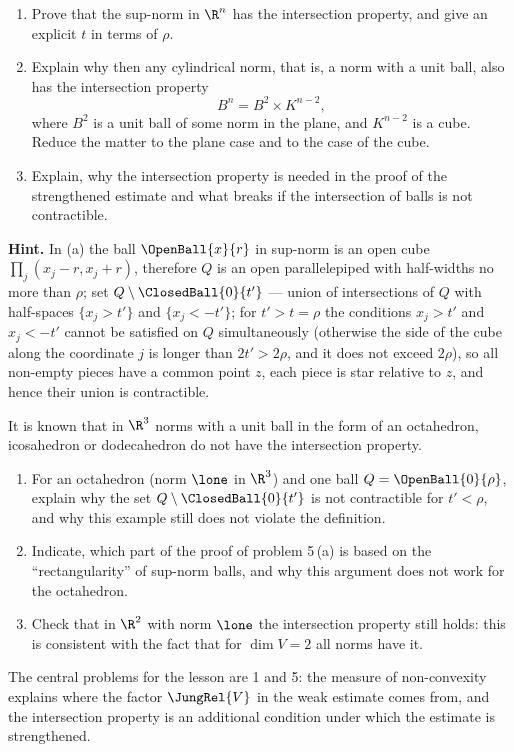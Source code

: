 \documentclass[a4paper,12pt]{report}
\begin{document}
\begin{task}
\begin{enumerate}[label=\textup{(\alph*)}]
\item Prove that the sup-norm in $\R^n$ has the intersection property, and give an explicit $t$ in terms of $\rho$.
\item Explain why then any cylindrical norm, that is, a norm with a unit ball, also has the intersection property
\[
B^n = B^2 \times K^{n-2},
\]
where $B^2$ is a unit ball of some norm in the plane, and $K^{n-2}$ is a cube. Reduce the matter to the plane case and to the case of the cube.
\item Explain\textup{,} why the intersection property is needed in the proof of the strengthened estimate and what breaks if the intersection of balls is not contractible.
\end{enumerate}

\textbf{Hint.} In \textup{(a)} the ball $\OpenBall{x}{r}$ in sup-norm is an open cube $\prod_j (x_j - r, x_j + r)$, therefore $Q$ is an open parallelepiped with half-widths no more than $\rho$\textup{;} set $Q \setminus \ClosedBall{0}{t'}$ --- union of intersections of $Q$ with half-spaces $\{x_j > t'\}$ and $\{x_j < -t'\}$\textup{;} for $t' > t = \rho$ the conditions $x_j > t'$ and $x_j < -t'$ cannot be satisfied on $Q$ simultaneously \textup{(}otherwise the side of the cube along the coordinate $j$ is longer than $2t' > 2\rho$, and it does not exceed $2\rho$\textup{)}, so all non-empty pieces have a common point $z$, each piece is star relative to $z$, and hence their union is contractible.
\end{task}

\begin{task}
It is known that in $\R^3$ norms with a unit ball in the form of an octahedron, icosahedron or dodecahedron do not have the intersection property.

\begin{enumerate}[label=\textup{(\alph*)}]
\item For an octahedron \textup{(}norm $\lone$ in $\R^3$\textup{)} and one ball $Q = \OpenBall{0}{\rho}$, explain why the set $Q \setminus \ClosedBall{0}{t'}$ is not contractible for $t' < \rho$, and why this example still does not violate the definition.
\item Indicate\textup{,} which part of the proof of problem \textup{5}\,\textup{(a)} is based on the ``rectangularity'' of sup-norm balls, and why this argument does not work for the octahedron.
\item Check that in $\R^2$ with norm $\lone$ the intersection property still holds\textup{:} this is consistent with the fact that for $\dim V = 2$ all norms have it.
\end{enumerate}
\end{task}

\vfill

{\small The central problems for the lesson are \textup{1} and \textup{5}\textup{:} the measure of non-convexity explains where the factor $\JungRel{V}$ in the weak estimate comes from, and the intersection property is an additional condition under which the estimate is strengthened\textup{.}}
\end{document}
